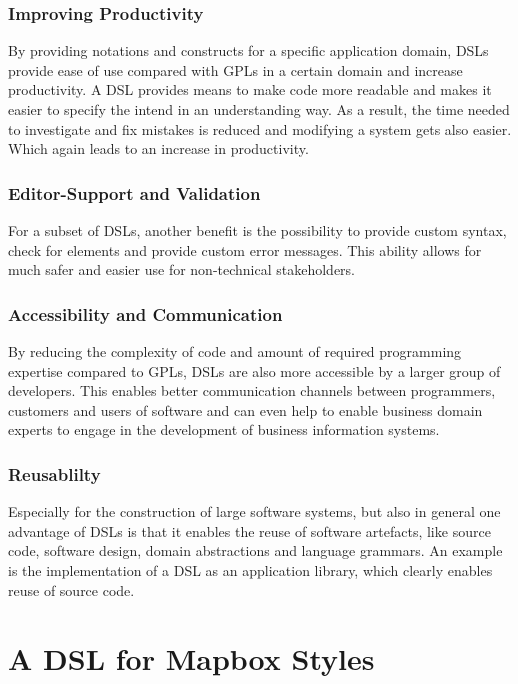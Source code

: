 \documentclass[conference]{IEEEtran}
\begin{document}
\subsubsection{Improving Productivity}
By providing notations and constructs for a specific application domain, DSLs provide ease of use compared with GPLs in a certain domain and increase productivity\cite{10.1145/1118890.1118892}. A DSL provides means to make code more readable and makes it easier to specify the intend in an understanding way. As a result, the time needed to investigate and fix mistakes is reduced and modifying a system gets also easier. Which again leads to an increase in productivity.
\subsubsection{Editor-Support and Validation}
For a subset of DSLs, another benefit is the possibility to provide custom syntax, check for elements and provide custom error messages. This ability allows for much safer and easier use for non-technical stakeholders.
\subsubsection{Accessibility and Communication}
By reducing the complexity of code and amount of required programming expertise compared to GPLs, DSLs are also more accessible by a larger group of developers. This enables better communication channels between programmers, customers and users of software and can even help to enable business domain experts to engage in the development of business information systems\cite{aram2015multilayered}.

\subsubsection{Reusablilty}
Especially for the construction of large software systems, but also in general one advantage of DSLs is that it enables the reuse of software artefacts, like source code, software design, domain abstractions and language grammars. An example is the implementation of a DSL as an application library, which clearly enables reuse of source code\cite{mernik2005and}.

\section{A DSL for Mapbox Styles}
\end{document}
